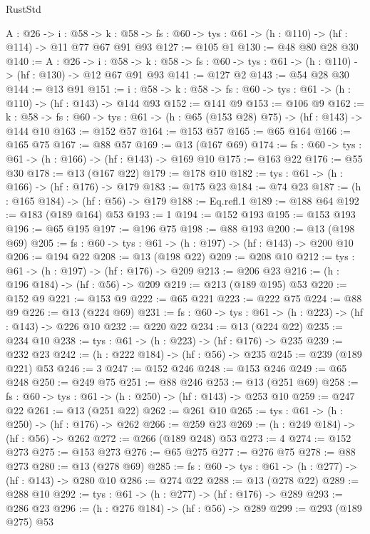 \begin{lexlean}{RustStd}
\begin{coremodule}
{\begin{coremodule}
{{{{{{{{{{{{{{{{{{{{{{{{{{  {A : @26} ->
  {i : @58} ->
  {k : @58} -> {fs : @60} -> {tys : @61} -> (h : @110) -> (hf : @114) -> @11 @77 @67 @91 @93
@127 := @105 @1
@130 := @48 @80 @28 @30
@140 := {A : @26} ->
  {i : @58} ->
  {k : @58} -> {fs : @60} -> {tys : @61} -> (h : @110) -> (hf : @130) -> @12 @67 @91 @93
@141 := @127 @2
@143 := @54 @28 @30
@144 := @13 @91
@151 := {i : @58} -> {k : @58} -> {fs : @60} -> {tys : @61} -> (h : @110) -> (hf : @143) -> @144 @93
@152 := @141 @9
@153 := @106 @9
@162 := {k : @58} ->
  {fs : @60} -> {tys : @61} -> (h : @65 (@153 @28) @75) -> (hf : @143) -> @144 @10
@163 := @152 @57
@164 := @153 @57
@165 := @65 @164
@166 := @165 @75
@167 := @88 @57
@169 := @13 (@167 @69)
@174 := {fs : @60} -> {tys : @61} -> (h : @166) -> (hf : @143) -> @169 @10
@175 := @163 @22
@176 := @55 @30
@178 := @13 (@167 @22)
@179 := @178 @10
@182 := {tys : @61} -> (h : @166) -> (hf : @176) -> @179
@183 := @175 @23
@184 := @74 @23
@187 := (h : @165 @184) -> (hf : @56) -> @179
@188 := Eq.refl.{1}
@189 := @188 @64
@192 := @183 (@189 @164) @53
@193 := 1
@194 := @152 @193
@195 := @153 @193
@196 := @65 @195
@197 := @196 @75
@198 := @88 @193
@200 := @13 (@198 @69)
@205 := {fs : @60} -> {tys : @61} -> (h : @197) -> (hf : @143) -> @200 @10
@206 := @194 @22
@208 := @13 (@198 @22)
@209 := @208 @10
@212 := {tys : @61} -> (h : @197) -> (hf : @176) -> @209
@213 := @206 @23
@216 := (h : @196 @184) -> (hf : @56) -> @209
@219 := @213 (@189 @195) @53
@220 := @152 @9
@221 := @153 @9
@222 := @65 @221
@223 := @222 @75
@224 := @88 @9
@226 := @13 (@224 @69)
@231 := {fs : @60} -> {tys : @61} -> (h : @223) -> (hf : @143) -> @226 @10
@232 := @220 @22
@234 := @13 (@224 @22)
@235 := @234 @10
@238 := {tys : @61} -> (h : @223) -> (hf : @176) -> @235
@239 := @232 @23
@242 := (h : @222 @184) -> (hf : @56) -> @235
@245 := @239 (@189 @221) @53
@246 := 3
@247 := @152 @246
@248 := @153 @246
@249 := @65 @248
@250 := @249 @75
@251 := @88 @246
@253 := @13 (@251 @69)
@258 := {fs : @60} -> {tys : @61} -> (h : @250) -> (hf : @143) -> @253 @10
@259 := @247 @22
@261 := @13 (@251 @22)
@262 := @261 @10
@265 := {tys : @61} -> (h : @250) -> (hf : @176) -> @262
@266 := @259 @23
@269 := (h : @249 @184) -> (hf : @56) -> @262
@272 := @266 (@189 @248) @53
@273 := 4
@274 := @152 @273
@275 := @153 @273
@276 := @65 @275
@277 := @276 @75
@278 := @88 @273
@280 := @13 (@278 @69)
@285 := {fs : @60} -> {tys : @61} -> (h : @277) -> (hf : @143) -> @280 @10
@286 := @274 @22
@288 := @13 (@278 @22)
@289 := @288 @10
@292 := {tys : @61} -> (h : @277) -> (hf : @176) -> @289
@293 := @286 @23
@296 := (h : @276 @184) -> (hf : @56) -> @289
@299 := @293 (@189 @275) @53
}}}}}}}}}}}}}}}}}}}}}}}}}}
\end{coremodule}}
\end{coremodule}
\end{lexlean}
